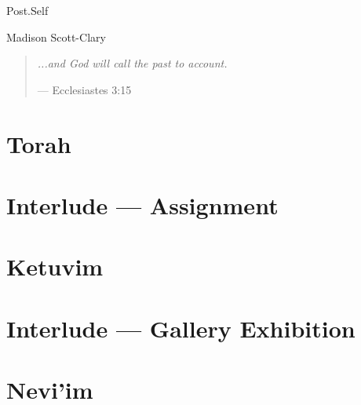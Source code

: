\documentclass[11pt]{memoir}
\begin{document}
  \frontmatter

  

  \pagestyle{plain}

  \doublespacing

  \begin{flushright}
    \null
    \vfill
    {\Huge\DisplayFont Post.Self}

    \vfill

    {\Large\DisplayFont Madi{\kern-1.2pt}s{\kern-0.5pt}on Scott-Clar{\kern-0.4pt}y}
  \end{flushright}
  \thispagestyle{empty}

  \newpage

  

  \tableofcontents*
  \newpage
  \null
  \cleardoublepage

  \onehalfspacing

  \null
  \vfill
  \begin{quote}
    \emph{...and God will call the past to account.}

    --- Ecclesiastes 3:15
  \end{quote}
  \vfill

  \mainmatter

  \pagestyle{ourbook}
  \part{Torah}
  

  \part{Interlude — Assignment}
  

  \part{Ketuvim}
  

  \part{Interlude — Gallery Exhibition}
  

  \part{Nevi'im}
  
\end{document}
